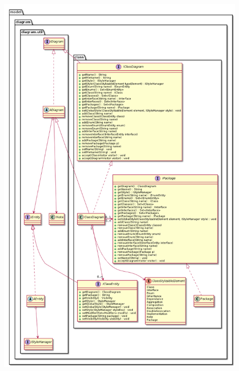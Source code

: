 \documentclass[a4paper,10pt]{article}
\begin{document}
	\begin{center}
	  \includegraphics[width=12cm]{Image/classExtendUtil.png}
	\end{center}
\end{document}
